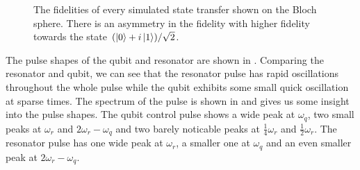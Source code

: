 \documentclass[main.tex]{subfiles}
\begin{document}
\begin{figure}[ht]
	\centering
	\caption{%
	The fidelities of every simulated state transfer shown on the Bloch sphere.
	There is an asymmetry in the fidelity with higher fidelity towards the state \((\ket{0}+i\ket{1})/\sqrt{2}\).
	}%
	\label{fig:bloch-fid}
\end{figure}


The pulse shapes of the qubit and resonator are shown in .
Comparing the resonator and qubit, we can see that the resonator pulse has rapid oscillations throughout the whole pulse while the qubit exhibits some small quick oscillation at sparse times.
The spectrum of the pulse is shown in  and gives us some insight into the pulse shapes.
The qubit control pulse shows a wide peak at \(\omega_q\), two small peaks at \(\omega_r\) and \(2\omega_r-\omega_q\) and two barely noticable peaks at \(\frac{1}{4}\omega_r\) and \(\frac{1}{2}\omega_r\). 
The resonator pulse has one wide peak at \(\omega_r\), a smaller one at \(\omega_q\) and an even smaller peak at \(2\omega_r-\omega_q\).
\end{document}
